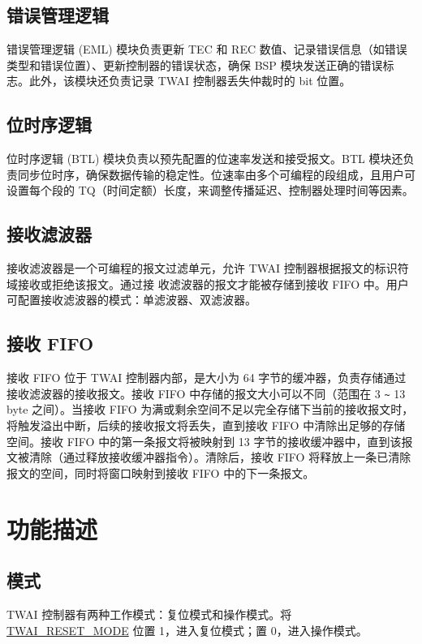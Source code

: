 \documentclass[main\_\_CN.tex]{subfiles}
\begin{document}
\subsection{错误管理逻辑}
错误管理逻辑 (EML) 模块负责更新 TEC 和 REC 数值、记录错误信息（如错误类型和错误位置）、更新控制器的错误状态，确保 BSP 模块发送正确的错误标志。此外，该模块还负责记录 TWAI 控制器丢失仲裁时的 bit 位置。

\subsection{位时序逻辑}
位时序逻辑 (BTL) 模块负责以预先配置的位速率发送和接受报文。BTL 模块还负责同步位时序，确保数据传输的稳定性。位速率由多个可编程的段组成，且用户可设置每个段的 TQ（时间定额）长度，来调整传播延迟、控制器处理时间等因素。

\subsection{接收滤波器}
接收滤波器是一个可编程的报文过滤单元，允许 TWAI 控制器根据报文的标识符域接收或拒绝该报文。通过接
收滤波器的报文才能被存储到接收 FIFO 中。用户可配置接收滤波器的模式：单滤波器、双滤波器。

\subsection{接收 FIFO}
接收 FIFO 位于 TWAI 控制器内部，是大小为 64 字节的缓冲器，负责存储通过接收滤波器的接收报文。接收 FIFO 中存储的报文大小可以不同（范围在 3 \verb+~+ 13 byte 之间）。当接收 FIFO 为满或剩余空间不足以完全存储下当前的接收报文时，将触发溢出中断，后续的接收报文将丢失，直到接收 FIFO 中清除出足够的存储空间。接收 FIFO 中的第一条报文将被映射到 13 字节的接收缓冲器中，直到该报文被清除（通过释放接收缓冲器指令）。清除后，接收 FIFO 将释放上一条已清除报文的空间，同时将窗口映射到接收 FIFO 中的下一条报文。

\section{功能描述}

\subsection{模式}
\label{sec:twai-modes}
\chipname{} TWAI 控制器有两种工作模式：复位模式和操作模式。将 \hyperref[fielddesc:TWAIRESETMODE]{TWAI\_RESET\_MODE} 位置 1，进入复位模式；置 0，进入操作模式。
\end{document}
